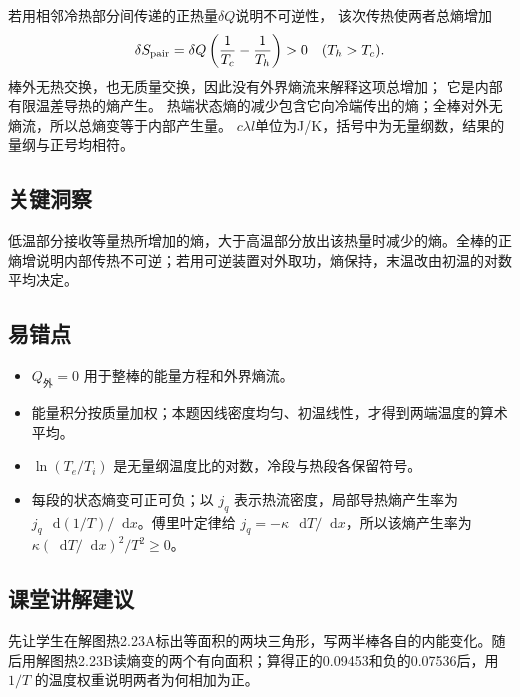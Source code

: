 \documentclass[UTF8,fontset=fandol,a4paper,11pt]{ctexart}
\newcommand{\dd}{\mathop{}\!\mathrm{d}}
\begin{document}
若用相邻冷热部分间传递的正热量$\delta Q$说明不可逆性，
该次传热使两者总熵增加
\[
\delta S_{\rm pair}
=\delta Q\left(\frac1{T_c}-\frac1{T_h}\right)>0
\quad(T_h>T_c).
\]
棒外无热交换，也无质量交换，因此没有外界熵流来解释这项总增加；
它是内部有限温差导热的熵产生。
热端状态熵的减少包含它向冷端传出的熵；全棒对外无熵流，所以总熵变等于内部产生量。
$c\lambda l$单位为J/K，括号中为无量纲数，结果的量纲与正号均相符。




\subsection*{关键洞察}

低温部分接收等量热所增加的熵，大于高温部分放出该热量时减少的熵。全棒的正熵增说明内部传热不可逆；若用可逆装置对外取功，熵保持，末温改由初温的对数平均决定。



\subsection*{易错点}

\begin{itemize}
\item $Q_{\text{外}}=0$ 用于整棒的能量方程和外界熵流。
\item 能量积分按质量加权；本题因线密度均匀、初温线性，才得到两端温度的算术平均。
\item $\ln(T_e/T_i)$ 是无量纲温度比的对数，冷段与热段各保留符号。
\item 每段的状态熵变可正可负；以 $j_q$ 表示热流密度，局部导热熵产生率为 $j_q\,\dd(1/T)/\dd x$。傅里叶定律给 $j_q=-\kappa\,\dd T/\dd x$，所以该熵产生率为 $\kappa(\dd T/\dd x)^2/T^2\ge0$。
\end{itemize}



\subsection*{课堂讲解建议}

先让学生在解图热2.23A标出等面积的两块三角形，写两半棒各自的内能变化。随后用解图热2.23B读熵变的两个有向面积；算得正的0.09453和负的0.07536后，用 $1/T$ 的温度权重说明两者为何相加为正。
\end{document}
